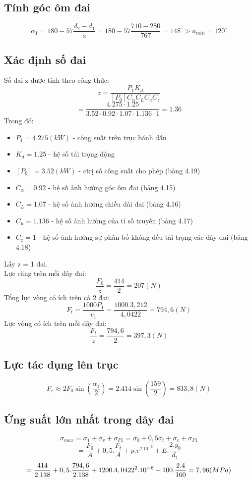 \subsection{Tính góc ôm đai}
\[
    \alpha_1 = 180 - 57\frac{d_2 - d_1}{a} = 180 - 57\frac{710 - 280}{767} = 148^{\circ} > a_{min} = 120^{\circ}
\]

\subsection{Xác định số đai}
Số đai z được tính theo công thức: 
\[
    z = \frac{P_1K_d}{[P_0]C_\alpha C_L C_u C_z}
\]
\[
    = \frac{4.275 \cdot 1.25}{3.52 \cdot 0.92 \cdot 1.07 \cdot 1.136 \cdot 1} = 1.36
\]
Trong đó:
\begin{itemize}
    \item $P_1 = 4.275 (kW)$ - công suất trên trục bánh dẫn
    \item $K_d = 1.25$ - hệ số tải trọng động
    \item $[P_0] = 3.52 (kW)$ - ctrị số công suất cho phép (bảng 4.19)
    \item $C_\alpha = 0.92$ - hệ số ảnh hưởng góc ôm đai (bảng 4.15)
    \item $C_L = 1.07$ - hệ số ảnh hưởng chiều dài đai (bảng 4.16)
    \item $C_u = 1.136$ - hệ số ảnh hưởng của tỉ số truyền (bảng 4.17)
    \item $C_z = 1$ - hệ số ảnh hưởng sự phân bố không đều tải trọng các dây đai (bảng 4.18)
\end{itemize}   
Lấy z = 1 đai. \\





Lực căng trên mỗi dây đai: \\
\[
    \frac{F_0}{z} = \frac{414}{2} = 207 (N)
\]
Tổng lực vòng có ích trên cả 2 đai: \\
\[
    F_t =\frac{1000P_1}{v_1} = \frac{1000.3,212}{4,0422} = 794,6 (N)
\]
Lực vòng có ích trên mỗi dây đai: \\
\[
    \frac{F_t}{z} = \frac{794,6}{2} = 397,3 (N)
\]
\subsection{Lực tác dụng lên trục}
\[
    F_r \approx 2F_0\sin(\frac{\alpha_1}{2}) = 2.414\sin(\frac{159}{2}) = 833,8 (N) 
\]
\subsection{Ứng suất lớn nhất trong dây đai}
\[
    \sigma_{max} = \sigma_1 + \sigma_v + \sigma_{F1} = \sigma_0 + 0,5\sigma_t + \sigma_v + \sigma_{F1} 
\]
\[
    = \frac{F_0}{A} + 0,5.\frac{F_t}{A} + \rho.v^2.10^{-6} + E.\frac{2.y_0}{d_1} 
\]
\[
    = \frac{414}{2.138} + 0,5.\frac{794,6}{2.138} + 1200.4,0422^2.10^{-6} + 100.\frac{2.4}{160} = 7,96 (MPa) \\
\]
